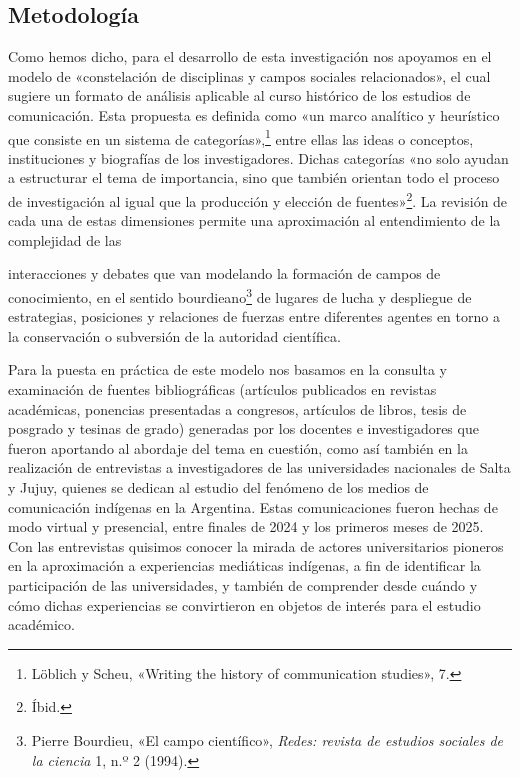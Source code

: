 \documentclass{tufte-handout}
\begin{document}
\begin{titlepage}
\hypertarget{metodologa}{%
\section{Metodología}\label{metodologa}}

Como hemos dicho, para el desarrollo de esta investigación nos apoyamos
en el modelo de «constelación de disciplinas y campos sociales
relacionados», el cual sugiere un formato de análisis aplicable al curso
histórico de los estudios de comunicación. Esta propuesta es definida
como «un marco analítico y heurístico que consiste en un sistema de
categorías»,\footnote{Löblich y Scheu, «Writing the history of
  communication studies», 7.} entre ellas las ideas o conceptos,
instituciones y biografías de los investigadores. Dichas categorías «no
solo ayudan a estructurar el tema de importancia, sino que también
orientan todo el proceso de investigación al igual que la producción y
elección de fuentes»\footnote{Íbid.}. La revisión de cada una de estas
dimensiones permite una aproximación al entendimiento de la complejidad
de las


 \end{titlepage}




\noindent  interacciones y debates que van modelando la formación de campos
de conocimiento, en el sentido bourdieano\footnote{Pierre Bourdieu, «El
  campo científico», \emph{Redes: revista de estudios sociales de la
  ciencia} 1, n.º 2 (1994).} de lugares de lucha y despliegue de
estrategias, posiciones y relaciones de fuerzas entre diferentes agentes
en torno a la conservación o subversión de la autoridad científica.


Para la puesta en práctica de este modelo nos basamos en la consulta y
examinación de fuentes bibliográficas (artículos publicados en revistas
académicas, ponencias presentadas a congresos, artículos de libros,
tesis de posgrado y tesinas de grado) generadas por los docentes e
investigadores que fueron aportando al abordaje del tema en cuestión,
como así también en la realización de entrevistas a investigadores de
las universidades nacionales de Salta y Jujuy, quienes se dedican al
estudio del fenómeno de los medios de comunicación indígenas en la
Argentina. Estas comunicaciones fueron hechas de modo virtual y
presencial, entre finales de 2024 y los primeros meses de 2025. Con las
entrevistas quisimos conocer la mirada de actores universitarios
pioneros en la aproximación a experiencias mediáticas indígenas, a fin
de identificar la participación de las universidades, y también de
comprender desde cuándo y cómo dichas experiencias se convirtieron en
objetos de interés para el estudio académico.
\end{document}
